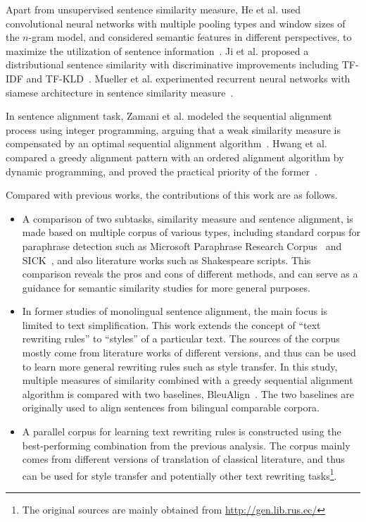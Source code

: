 \documentclass[runningheads]{llncs}
\begin{document}
Apart from unsupervised sentence similarity measure, He et al. used convolutional neural networks with multiple pooling types and window sizes of the $n$-gram model, and considered semantic features in different perspectives, to maximize the utilization of sentence information~\cite{he2015multi}. Ji et al. proposed a distributional sentence similarity with discriminative improvements including TF-IDF and TF-KLD~\cite{ji2013discriminative}. Mueller et al. experimented recurrent neural networks with siamese architecture in sentence similarity measure~\cite{mueller2016siamese}.

In sentence alignment task, Zamani et al. modeled the sequential alignment process using integer programming, arguing that a weak similarity measure is compensated by an optimal sequential alignment algorithm~\cite{zamani2016sentence}. Hwang et al. compared a greedy alignment pattern with an ordered alignment algorithm by dynamic programming, and proved the practical priority of the former~\cite{hwang2015aligning}.

Compared with previous works, the contributions of this work are as follows.
\begin{itemize}
	\item A comparison of two subtasks, similarity measure and sentence alignment, is made based on multiple corpus of various types, including standard corpus for paraphrase detection such as Microsoft Paraphrase Research Corpus~\cite{quirk2004monolingual,dolan2004unsupervised} and SICK~\cite{marelli2014semeval}, and also literature works such as Shakespeare scripts. This comparison reveals the pros and cons of different methods, and can serve as a guidance for semantic similarity studies for more general purposes.
	\item In former studies of monolingual sentence alignment, the main focus is limited to text simplification. This work extends the concept of ``text rewriting rules'' to ``styles'' of a particular text. The sources of the corpus mostly come from literature works of different versions, and thus can be used to learn more general rewriting rules such as style transfer. In this study, multiple measures of similarity combined with a greedy sequential alignment algorithm is compared with two baselines, BleuAlign~\cite{sennrich2010mt,sennrich2011iterative}. The two baselines are originally used to align sentences from bilingual comparable corpora.
	\item A parallel corpus for learning text rewriting rules is constructed using the best-performing combination from the previous analysis. The corpus mainly comes from different versions of translation of classical literature, and thus can be used for style transfer and potentially other text rewriting tasks\footnote{The original sources are mainly obtained from \url{http://gen.lib.rus.ec/}}.
\end{itemize}
\end{document}
